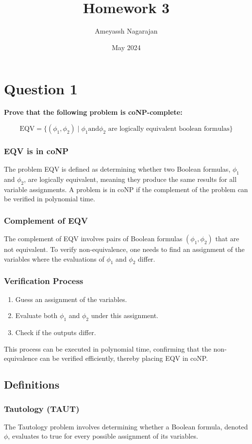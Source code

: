 \documentclass{article}
\title{Homework 3}
\author{Ameyassh Nagarajan}
\date{May 2024}
\begin{document}
\maketitle

\section{Question 1}
\textbf{Prove that the following problem is coNP-complete:}

\[
\text{EQV} = \{(\phi_1,\phi_2) \mid \phi_1 \text{and} \phi_2 \text{ are logically equivalent boolean formulas} \}
\]

\subsubsection*{EQV is in coNP}
The problem EQV is defined as determining whether two Boolean formulas, $\phi_1$ and $\phi_2$, are logically equivalent, meaning they produce the same results for all variable assignments. A problem is in coNP if the complement of the problem can be verified in polynomial time.

\subsubsection*{Complement of EQV}
The complement of EQV involves pairs of Boolean formulas $(\phi_1, \phi_2)$ that are not equivalent. To verify non-equivalence, one needs to find an assignment of the variables where the evaluations of $\phi_1$ and $\phi_2$ differ.

\subsubsection*{Verification Process}
\begin{enumerate}
    \item Guess an assignment of the variables.
    \item Evaluate both $\phi_1$ and $\phi_2$ under this assignment.
    \item Check if the outputs differ.
\end{enumerate}
This process can be executed in polynomial time, confirming that the non-equivalence can be verified efficiently, thereby placing EQV in coNP.

\subsection*{Definitions}
\subsubsection*{Tautology (TAUT)}
The Tautology problem involves determining whether a Boolean formula, denoted $\phi$, evaluates to true for every possible assignment of its variables.
\end{document}
